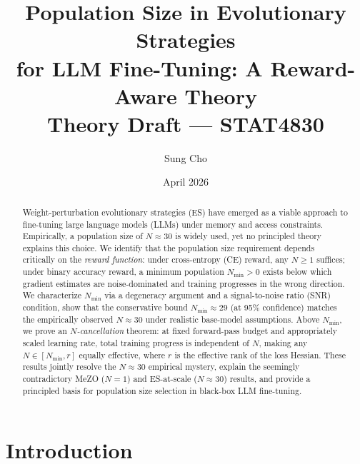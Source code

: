 \documentclass[11pt]{article}
\title{\textbf{Population Size in Evolutionary Strategies\\
for LLM Fine-Tuning: A Reward-Aware Theory}\\[0.5em]
\large Theory Draft --- STAT4830}
\author{Sung Cho}
\date{April 2026}
\theoremstyle{definition}
\theoremstyle{remark}
\newcommand{\Nmin}{N_{\mathrm{min}}}
\begin{document}
\maketitle

\begin{abstract}
Weight-perturbation evolutionary strategies (ES) have emerged as a viable approach to fine-tuning large language models (LLMs) under memory and access constraints. Empirically, a population size of $N \approx 30$ is widely used, yet no principled theory explains this choice. We identify that the population size requirement depends critically on the \emph{reward function}: under cross-entropy (CE) reward, any $N \geq 1$ suffices; under binary accuracy reward, a minimum population $\Nmin > 0$ exists below which gradient estimates are noise-dominated and training progresses in the wrong direction. We characterize $\Nmin$ via a degeneracy argument and a signal-to-noise ratio (SNR) condition, show that the conservative bound $\Nmin \approx 29$ (at 95\% confidence) matches the empirically observed $N \approx 30$ under realistic base-model assumptions. Above $\Nmin$, we prove an \emph{$N$-cancellation} theorem: at fixed forward-pass budget and appropriately scaled learning rate, total training progress is independent of $N$, making any $N \in [\Nmin, r]$ equally effective, where $r$ is the effective rank of the loss Hessian. These results jointly resolve the $N \approx 30$ empirical mystery, explain the seemingly contradictory MeZO ($N=1$) and ES-at-scale ($N \approx 30$) results, and provide a principled basis for population size selection in black-box LLM fine-tuning.
\end{abstract}

\section{Introduction}
\end{document}
